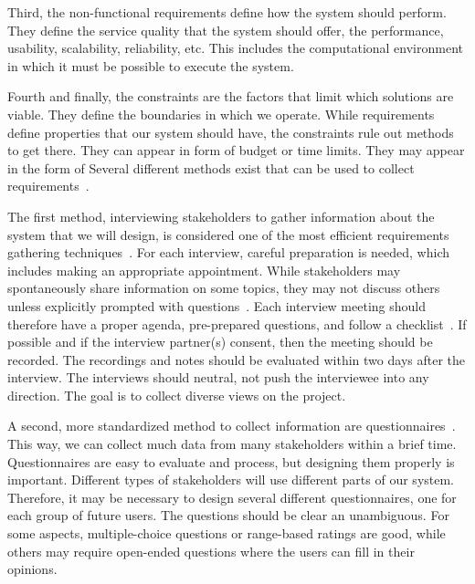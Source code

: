 Third, the non-functional requirements define how the system should perform.
They define the service quality that the system should offer, the performance, usability, scalability, reliability, etc.
This includes the computational environment in which it must be possible to execute the system.

Fourth and finally, the constraints are the factors that limit which solutions are viable.
They define the boundaries in which we operate.
While requirements define properties that our system should have, the constraints rule out methods to get there.
They can appear in form of budget or time limits.
They may appear in the form of %
\endhsection%
%
%
%
Several different methods exist that can be used to collect requirements~\cite{Z2003RDARS}.

The first method, interviewing stakeholders to gather information about the system that we will design, is considered one of the most efficient requirements gathering techniques~\cite{DTHJM2006EORETERDFASR,Z2003RDARS}.
For each interview, careful preparation is needed, which includes making an appropriate appointment.
While stakeholders may spontaneously share information on some topics, they may not discuss others unless explicitly prompted with questions~\cite{BJF2014WSWOWNSATAESOTIIREEI}.
Each interview meeting should therefore have a proper agenda, pre-prepared questions, and follow a checklist~\cite{WSEG2016ETIOAKOSTCORQQ}.
If possible and if the interview partner(s) consent, then the meeting should be recorded.
The recordings and notes should be evaluated within two days after the interview.
The interviews should neutral, not push the interviewee into any direction.
The goal is to collect diverse views on the project.

A second, more standardized method to collect information are questionnaires~\cite{TAE2008ISRTDQTSTDQSSAE,Z2003RDARS}.
This way, we can collect much data from many stakeholders within a brief time.
Questionnaires are easy to evaluate and process, but designing them properly is important.
Different types of stakeholders will use different parts of our system.
Therefore, it may be necessary to design several different questionnaires, one for each group of future users.
The questions should be clear an unambiguous.
For some aspects, multiple-choice questions or range-based ratings are good, while others may require open-ended questions where the users can fill in their opinions.

